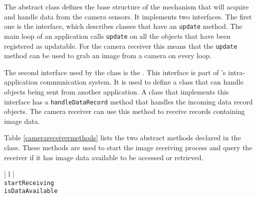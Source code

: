 The \CameraReceiver{} abstract class defines the base structure of the mechanism that will acquire and handle
data from the camera sensors. It implements two \RD{} interfaces. The first one is the \iUpdateable{} interface,
which describes classes that have an \texttt{up\-date} method. The main loop of an \RD{} application calls 
\texttt{up\-date} on all the objects that have been registered as updatable. For the camera receiver this means 
that the \texttt{up\-date} method can be used to grab an image from a camera on every loop.

The second interface used by the \CameraReceiver{} class is the \iDataRecordHandler{}. This interface is part
of \RD{}'s intra-application communication system. It is used to define a class that can handle \iDataRecord{} 
objects being sent from another application. A class that implements this interface has a 
\texttt{han\-dle\-Da\-ta\-Re\-cord} method that handles the incoming data record objects. The camera receiver
can use this method to receive records containing image data.

Table \ref{camerareceivermethods} lists the two abstract methods declared in the \CameraReceiver{} class.
These methods are used to start the image receiving process and query the receiver if it has image data 
available to be accessed or retrieved. 

\begin{table}[ht]
\caption{Public methods in the \CameraReceiver{} class }
\begin{center}
\begin{tabular}{| l |}
	\hline 
	 \\
	\hline \hline
	\texttt{startReceiving} \\
	\texttt{isDataAvailable} \\
	\hline
\end{tabular}
\end{center}
\label{camerareceivermethods}
\end{table}